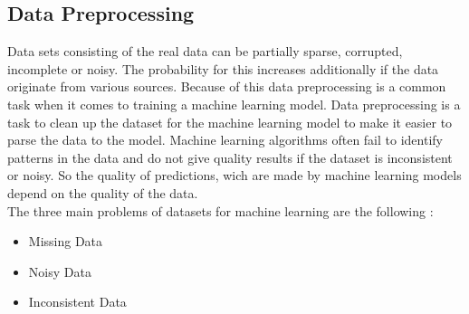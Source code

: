 \documentclass[../masterarbeit.tex]{subfiles}
\begin{document}
\subsection{Data Preprocessing}


Data sets consisting of the real data can be partially sparse, corrupted, incomplete or noisy. The probability for this increases additionally if the data originate from various sources. Because of this data preprocessing is a common task when it comes to training a machine learning model. Data preprocessing is a task to clean up the dataset for the machine learning model to make it easier to parse the data to the model. Machine learning algorithms often fail to identify patterns in the data  and do not give quality results if the dataset is inconsistent or noisy. So the quality of predictions, wich are made by machine learning models depend on the quality of the data. \autocite[]{Pragati_Preprocessing:2022} \autocite[]{kotsiantis2006data} \\
The three main problems of datasets for machine learning are the following \autocite[]{Pragati_Preprocessing:2022}:
\begin{itemize}
	\item Missing Data
	\item Noisy Data
	\item Inconsistent Data
\end{itemize}
\end{document}
